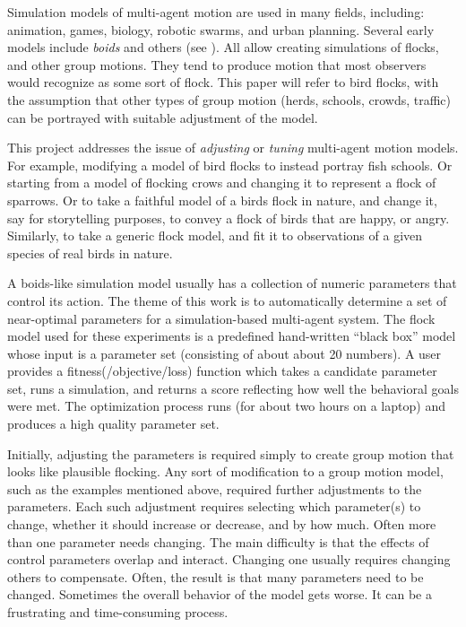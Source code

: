 \documentclass[letterpaper]{article}
\begin{document}
Simulation models of multi-agent motion are used in many fields, including: animation, games, biology, robotic swarms, and urban planning. Several early models include \textit{boids} \citep{reynolds_flocks_1987} and others (see ). All allow creating simulations of flocks, and other group motions.  They tend to produce motion that most observers would recognize as some sort of flock. This paper will refer to bird flocks, with the assumption that other types of group motion (herds, schools, crowds, traffic) can be portrayed with suitable adjustment of the model.

This project addresses the issue of \textit{adjusting} or \textit{tuning} multi-agent motion models. For example, modifying a model of bird flocks to instead portray fish schools. Or starting from a model of flocking crows and changing it to represent a flock of sparrows. Or to take a faithful model of a birds flock in nature, and change it, say for storytelling purposes, to convey a flock of birds that are happy, or angry. Similarly, to take a generic flock model, and fit it to observations of a given species of real birds in nature.

A boids-like simulation model usually has a collection of numeric parameters that control its action. The theme of this work is to automatically determine a set of near-optimal parameters for a simulation-based multi-agent system. The flock model used for these experiments is a predefined hand-written ``black box'' model whose input is a parameter set (consisting of about about 20 numbers). A user provides a fitness(/objective/loss) function which takes a candidate parameter set, runs a simulation, and returns a score reflecting how well the behavioral goals were met. The optimization process runs (for about two hours on a laptop) and produces a high quality parameter set.

Initially, adjusting the parameters is required simply to create group motion that looks like plausible flocking. Any sort of modification to a group motion model, such as the examples mentioned above, required further adjustments to the parameters. Each such adjustment requires selecting which parameter(s) to change, whether it should increase or decrease, and by how much. Often more than one parameter needs changing. The main difficulty is that the effects of control parameters overlap and interact. Changing one usually requires changing others to compensate. Often, the result is that many parameters need to be changed. Sometimes the overall behavior of the model gets worse. It can be a frustrating and time-consuming process.
\end{document}
